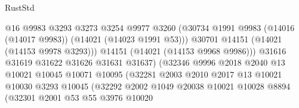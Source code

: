 \begin{lexlean}{RustStd}
\begin{coremodule}
                                          @16
                                          @9983
                                          @3293
                                          @3273
                                          @3254
                                          @9977
                                          @3260
                                          (@30734
                                            @1991
                                            @9983
                                            (@14016 (@14017 @9983))
                                            (@14021 (@14023 @1991 @53)))
                                          @30701
                                          @14151
                                          (@14021 (@14153 @9978 @3293)))
                                        @14151
                                        (@14021 (@14153 @9968 @9986)))
                                      @31616
                                      @31619
                                      @31622
                                      @31626
                                      @31631
                                      @31637)
                                    (@32346
                                      @9996
                                      @2018
                                      @2040
                                      @13
                                      @10021
                                      @10045
                                      @10071
                                      @10095
                                      (@32281
                                        @2003
                                        @2010
                                        @2017
                                        @13
                                        @10021
                                        @10030
                                        @3293
                                        @10045
                                        (@32292
                                          @2002
                                          @1049
                                          @20038
                                          @10021
                                          @10028
                                          @8894
                                          (@32301
                                            @2001
                                            @53
                                            @55
                                            @3976
                                            @10020

\end{coremodule}
\end{lexlean}
